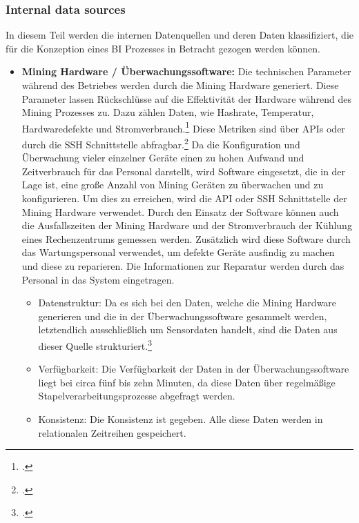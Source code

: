 \subsubsection{Internal data sources} \label{toc:internedatenquellen}

In diesem Teil werden die internen Datenquellen und deren Daten klassifiziert, die für die Konzeption eines \ac{BI} Prozesses
in Betracht gezogen werden können.

\begin{itemize}
    \item \textbf{Mining Hardware / Überwachungssoftware: }
    Die technischen Parameter während des Betriebes werden durch die Mining Hardware generiert. Diese Parameter lassen
    Rückschlüsse auf die Effektivität der Hardware während des Mining Prozesses zu. Dazu zählen Daten, wie Hashrate, Temperatur,
    Hardwaredefekte und Stromverbrauch.\footcite[Cf.][p. 12]{antminer2021manual} Diese Metriken sind über \acp{API} oder
    durch die \ac{SSH} Schnittstelle abfragbar.\footcite[Cf.][]{awesomeminer2021api} Da die Konfiguration und Überwachung
    vieler einzelner Geräte einen zu hohen Aufwand und Zeitverbrauch für das Personal darstellt, wird Software eingesetzt,
    die in der Lage ist, eine große Anzahl von Mining Geräten zu überwachen und zu konfigurieren. Um dies zu erreichen, wird
    die \ac{API} oder \ac{SSH} Schnittstelle der Mining Hardware verwendet. Durch den Einsatz der Software können auch die
    Ausfallszeiten der Mining Hardware und der Stromverbrauch der Kühlung eines Rechenzentrums gemessen werden. Zusätzlich
    wird diese Software durch das Wartungspersonal verwendet, um defekte Geräte ausfindig zu machen und diese zu reparieren.
    Die Informationen zur Reparatur werden durch das Personal in das System eingetragen.
    \begin{itemize}
        \item Datenstruktur: Da es sich bei den Daten, welche die Mining Hardware generieren und die in der Überwachungssoftware
        gesammelt werden, letztendlich ausschließlich um Sensordaten handelt, sind die Daten aus dieser Quelle
        strukturiert.\footcite[Cf.][p. 27]{kimble2015big}
        \item Verfügbarkeit: Die Verfügbarkeit der Daten in der Überwachungssoftware liegt bei circa fünf bis zehn Minuten,
        da diese Daten über regelmäßige Stapelverarbeitungsprozesse abgefragt werden.
        \item Konsistenz: Die Konsistenz ist gegeben. Alle diese Daten werden in relationalen Zeitreihen gespeichert. 

\end{itemize}
\end{itemize}
